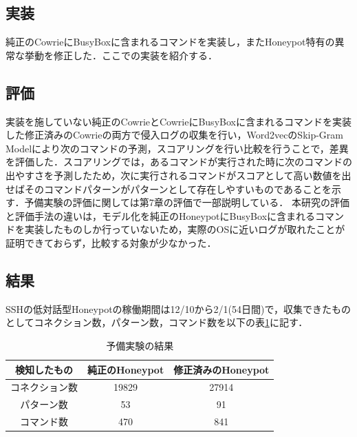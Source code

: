 \subsection{実装}
\label{eval:impl}
純正のCowrieにBusyBoxに含まれるコマンドを実装し，またHoneypot特有の異常な挙動を修正した．ここでの実装を紹介する．

\subsection{評価}
\label{eval:eval}
実装を施していない純正のCowrieとCowrieにBusyBoxに含まれるコマンドを実装した修正済みのCowrieの両方で侵入ログの収集を行い，Word2vecのSkip-Gram Modelにより次のコマンドの予測，スコアリングを行い比較を行うことで，差異を評価した．スコアリングでは，あるコマンドが実行された時に次のコマンドの出やすさを予測したため，次に実行されるコマンドがスコアとして高い数値を出せばそのコマンドパターンがパターンとして存在しやすいものであることを示す．予備実験の評価に関しては第7章の評価で一部説明している．
本研究の評価と評価手法の違いは，モデル化を純正のHoneypotにBusyBoxに含まれるコマンドを実装したものしか行っていないため，実際のOSに近いログが取れたことが証明できておらず，比較する対象が少なかった．

\subsection{結果}
\label{eval:conc}
SSHの低対話型Honeypotの稼働期間は12/10から2/1(54日間)で，収集できたものとしてコネクション数，パターン数，コマンド数を以下の表\ref{table:kenchi}に記す．

\vspace{3mm}
\newlength{\myheighta}
\setlength{\myheighta}{10mm}
\begin{table}[h]
 \caption{予備実験の結果}
 \label{table:kenchi}
 \centering
  \begin{tabular}{|c||c|c|}
   \hline
   \parbox[c][\myheighta][c]{0cm}{} 検知したもの & 純正のHoneypot & 修正済みのHoneypot \\
   \hline \hline 
     \parbox[c][\myheighta][c]{0cm}{} コネクション数  & 19829 & 27914 \\
     \hline
     \parbox[c][\myheighta][c]{0cm}{} パターン数  & 53 & 91 \\
     \hline
     \parbox[c][\myheighta][c]{0cm}{} コマンド数  & 470 & 841 \\
     \hline
  \end{tabular}
\end{table}
\vspace{5mm}

